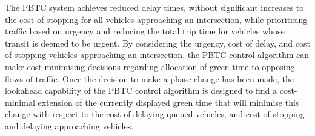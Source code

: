 The PBTC system achieves reduced delay times, without significant increases to the cost of stopping for all vehicles approaching an intersection, while prioritising traffic based on urgency and reducing the total trip time for vehicles whose transit is deemed to be urgent. By considering the urgency, cost of delay, and cost of stopping vehicles approaching an intersection, the PBTC control algorithm can make cost-minimising decisions regarding allocation of green time to opposing flows of traffic. Once the decision to make a phase change has been made, the lookahead capability of the PBTC control algorithm is designed to find a cost-minimal extension of the currently displayed green time that will minimise this change with respect to the cost of delaying queued vehicles, and cost of stopping and delaying approaching vehicles.



